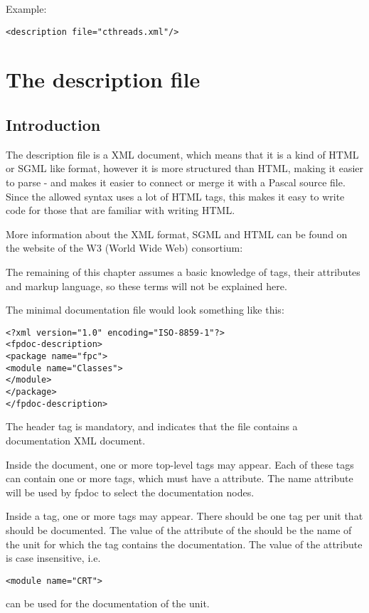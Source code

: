 Example:
\begin{verbatim}
<description file="cthreads.xml"/>
\end{verbatim}


\chapter{The description file}
\label{ch:descriptionfile}

\section{Introduction}
The description file is a XML document, which means that it is a kind of
HTML or SGML like format, however it is more structured than HTML, making it
easier to parse - and makes it easier to connect or merge it with a Pascal
source file. Since the allowed syntax uses a lot of HTML tags, this makes 
it easy to write code for those that are familiar with writing HTML.

More information about the XML format, SGML and HTML can be found on the 
website of the W3 (World Wide Web) consortium:  

The remaining of this chapter assumes a basic knowledge of tags, their
attributes and markup language, so these terms will not be explained here. 

The minimal documentation file would look something like this:
\begin{verbatim}
<?xml version="1.0" encoding="ISO-8859-1"?>
<fpdoc-description>
<package name="fpc">
<module name="Classes">
</module>
</package>
</fpdoc-description>
\end{verbatim}
The header  tag is mandatory, and indicates that the file contains a
documentation XML document.

Inside the document, one or more top-level  
tags may appear. Each of these tags can contain one or more 
tags, which must have a  attribute. The name attribute will be
used by fpdoc to select the documentation nodes.

Inside a  tag, one or more  tags may appear. There
should be one  tag per unit that should be documented. The value
of the  attribute of the  should be the name of the
unit for which the  tag contains the documentation. The value
of the  attribute is case insensitive, i.e. 
\begin{verbatim}
<module name="CRT">
\end{verbatim}
can be used for the documentation of the  unit.

